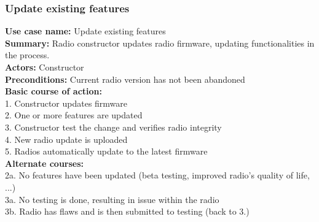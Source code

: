 \documentclass[11pt]{article}
\begin{document}
\subsubsection{Update existing features}
\textbf{Use case name:} Update existing features\\
\textbf{Summary:} Radio constructor updates radio firmware, updating functionalities in the process.\\
\textbf{Actors:} Constructor\\
\textbf{Preconditions:} Current radio version has not been abandoned\\
\textbf{Basic course of action:}\\
\hspace*{10mm}1. Constructor updates firmware\\
\hspace*{10mm}2. One or more features are updated\\
\hspace*{10mm}3. Constructor test the change and verifies radio integrity\\
\hspace*{10mm}4. New radio update is uploaded\\
\hspace*{10mm}5. Radios automatically update to the latest firmware\\
\textbf{Alternate courses:}\\
\hspace*{10mm}2a. No features have been updated (beta testing, improved radio's quality of life, ...)\\
\hspace*{10mm}3a. No testing is done, resulting in issue within the radio\\
\hspace*{10mm}3b. Radio has flaws and is then submitted to testing (back to 3.)\\

\pagebreak
\end{document}
